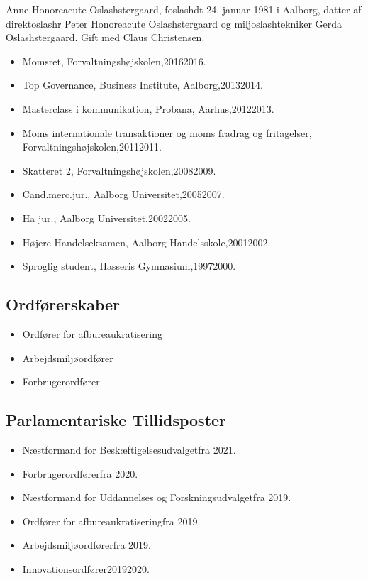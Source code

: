 \documentclass[11pt, a4paper]{awesome-cv}
\begin{document}
\makecvheader[R]
\makelettertitle
\begin{cvletter}
Anne Honoreacute Oslashstergaard, foslashdt 24. januar 1981 i Aalborg, datter af direktoslashr Peter Honoreacute Oslashstergaard og miljoslashtekniker Gerda Oslashstergaard. Gift med Claus Christensen.

\begin{itemize}
\item Momsret, Forvaltningshøjskolen,20162016.
\item Top Governance, Business Institute, Aalborg,20132014.
\item Masterclass i kommunikation, Probana, Aarhus,20122013.
\item Moms  internationale transaktioner og moms  fradrag og fritagelser, Forvaltningshøjskolen,20112011.
\item Skatteret 2, Forvaltningshøjskolen,20082009.
\item Cand.merc.jur., Aalborg Universitet,20052007.
\item Ha jur., Aalborg Universitet,20022005.
\item Højere Handelseksamen, Aalborg Handelsskole,20012002.
\item Sproglig student, Hasseris Gymnasium,19972000.
\end{itemize}
\subsection*{Ordførerskaber}
\begin{itemize}
\item Ordfører for afbureaukratisering
\item Arbejdsmiljøordfører
\item Forbrugerordfører
\end{itemize}
\subsection*{Parlamentariske Tillidsposter}
\begin{itemize}
\item Næstformand for Beskæftigelsesudvalgetfra 2021.
\item Forbrugerordførerfra 2020.
\item Næstformand for Uddannelses og Forskningsudvalgetfra 2019.
\item Ordfører for afbureaukratiseringfra 2019.
\item Arbejdsmiljøordførerfra 2019.
\item Innovationsordfører20192020.
\end{itemize}

\end{cvletter}
\end{document}
